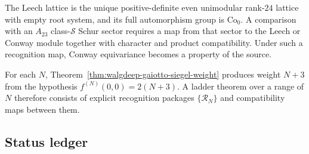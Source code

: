 \begin{theorem}
\label{thm:walgdeep-N24-conway}
\ClaimStatusConditional
The Leech lattice is the unique positive-definite even unimodular
rank-\(24\) lattice with empty root system, and its full automorphism
group is \(\mathrm{Co}_0\).  A comparison with an \(A_{23}\)
class-\(\mathcal S\) Schur sector requires a map from that sector to
the Leech or Conway module together with character and product
compatibility.  Under such a recognition map, Conway equivariance
becomes a property of the source.
\end{theorem}

\begin{theorem}
\label{thm:walgdeep-N13-N24-ladder}
\ClaimStatusOpen
For each \(N\), Theorem~\ref{thm:walgdeep-gaiotto-siegel-weight}
produces weight \(N+3\) from the hypothesis
\(f^{(N)}(0,0)=2(N+3)\).  A ladder theorem over a range of \(N\)
therefore consists of explicit recognition packages
\(\{\mathcal R_N\}\) and compatibility maps between them.
\end{theorem}

\subsection{Status ledger}

